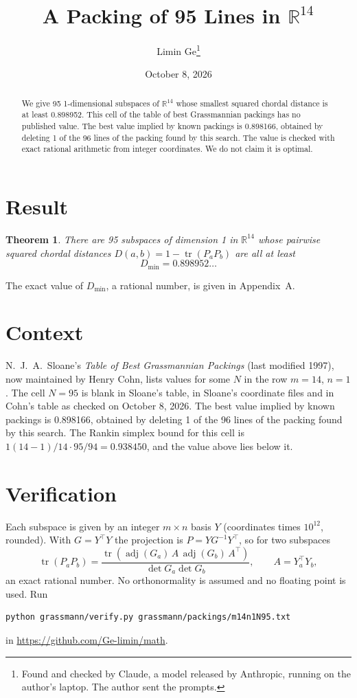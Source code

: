 \documentclass[11pt,a4paper]{article}
\title{A Packing of 95 Lines in $\mathbb{R}^{14}$}
\author{Limin Ge\thanks{Found and checked by Claude, a model released by Anthropic, running on the author's laptop. The author sent the prompts.}}
\date{October 8, 2026}
\newtheorem*{theorem}{Theorem}
\begin{document}
\maketitle
\begin{abstract}
We give 95 1-dimensional subspaces of $\mathbb{R}^{14}$ whose smallest squared chordal distance is at least 0.898952. This cell of the table of best Grassmannian packings has no published value. The best value implied by known packings is 0.898166, obtained by deleting 1 of the 96 lines of the packing found by this search. The value is checked with exact rational arithmetic from integer coordinates. We do not claim it is optimal.
\end{abstract}

\section{Result}
\begin{theorem}
There are 95 subspaces of dimension 1 in $\mathbb{R}^{14}$ whose pairwise squared chordal distances $D(a,b) = 1 - \operatorname{tr}(P_aP_b)$ are all at least
\[ D_{\min} = 0.898952\ldots \]
\end{theorem}
The exact value of $D_{\min}$, a rational number, is given in Appendix~A.


\section{Context}
N.~J.~A.~Sloane's \emph{Table of Best Grassmannian Packings} (last modified 1997), now maintained by Henry Cohn, lists values for some $N$ in the row $m=14$, $n=1$. The cell $N=95$ is blank in Sloane's table, in Sloane's coordinate files and in Cohn's table as checked on October 8, 2026. The best value implied by known packings is 0.898166, obtained by deleting 1 of the 96 lines of the packing found by this search. The Rankin simplex bound for this cell is $1(14-1)/14\cdot 95/94 = 0.938450$, and the value above lies below it.


\section{Verification}
Each subspace is given by an integer $m\times n$ basis $Y$ (coordinates times $10^{12}$, rounded). With $G=Y^\top Y$ the projection is $P=YG^{-1}Y^\top$, so for two subspaces
\[ \operatorname{tr}(P_aP_b)=\frac{\operatorname{tr}(\operatorname{adj}(G_a)\,A\,\operatorname{adj}(G_b)\,A^\top)}{\det G_a\det G_b},\qquad A=Y_a^\top Y_b, \]
an exact rational number. No orthonormality is assumed and no floating point is used. Run
\begin{verbatim}
python grassmann/verify.py grassmann/packings/m14n1N95.txt
\end{verbatim}
in \url{https://github.com/Ge-limin/math}.
\end{document}

